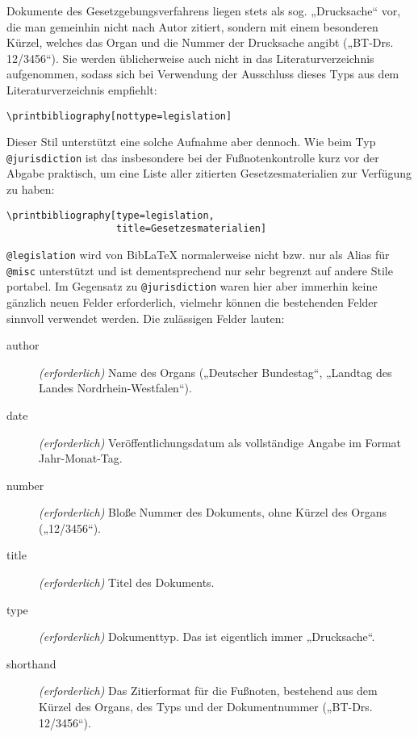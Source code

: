 \documentclass[11pt,a4paper,DIV=calc]{scrartcl}
\newcommand\software[1]{\textsf{#1}}
\newcommand\Biblatex{\software{Bib\LaTeX{}}\xspace}
\begin{document}
Dokumente des Gesetzgebungsverfahrens liegen stets als sog.
„Drucksache“ vor, die man gemeinhin nicht nach Autor zitiert, sondern
mit einem besonderen Kürzel, welches das Organ und die Nummer der
Drucksache angibt („BT-Drs. 12/3456“). Sie werden üblicherweise auch
nicht in das Literaturverzeichnis aufgenommen, sodass sich bei
Verwendung der Ausschluss dieses Typs aus dem Literaturverzeichnis
empfiehlt:

\begin{verbatim}
\printbibliography[nottype=legislation]
\end{verbatim}

Dieser Stil unterstützt eine solche Aufnahme aber dennoch. Wie beim
Typ \verb+@jurisdiction+ ist das insbesondere bei der
Fußnotenkontrolle kurz vor der Abgabe praktisch, um eine Liste aller
zitierten Gesetzesmaterialien zur Verfügung zu haben:

\begin{verbatim}
\printbibliography[type=legislation,
                   title=Gesetzesmaterialien]
\end{verbatim}

\verb+@legislation+ wird von \Biblatex normalerweise nicht
bzw. nur als Alias für \verb+@misc+ unterstützt und ist
dementsprechend nur sehr begrenzt auf andere Stile portabel. Im
Gegensatz zu \verb+@jurisdiction+ waren hier aber immerhin keine
gänzlich neuen Felder erforderlich, vielmehr können die bestehenden
Felder sinnvoll verwendet werden. Die zulässigen Felder lauten:

\begin{description}
\item[author] \emph{(erforderlich)} Name des Organs („Deutscher
  Bundestag“, „Landtag des Landes Nordrhein-Westfalen“).
\item[date] \emph{(erforderlich)} Veröffentlichungsdatum als
  vollständige Angabe im Format Jahr-Monat-Tag.
\item[number] \emph{(erforderlich)} Bloße Nummer des Dokuments, ohne
  Kürzel des Organs („12/3456“).
\item[title] \emph{(erforderlich)} Titel des Dokuments.
\item[type] \emph{(erforderlich)} Dokumenttyp. Das ist eigentlich
  immer „Drucksache“.
\item[shorthand] \emph{(erforderlich)} Das Zitierformat für die Fußnoten,
  bestehend aus dem Kürzel des Organs, des Typs und der Dokumentnummer
  („BT-Drs. 12/3456“).
\end{description}
\end{document}
